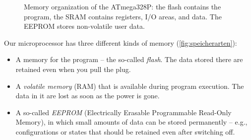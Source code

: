 \documentclass[a4paper,12pt]{article}
\begin{document}
\begin{figure}[ht]
\centering
{}
\caption{
    Memory organization of the ATmega328P: the flash contains the program, the
    SRAM contains registers, I/O areas, and data. The EEPROM stores
    non-volatile user data.
}
\label{fig:speicherarten}
\end{figure}

\noindent
Our microprocessor has three different kinds of memory
(\autoref{fig:speicherarten}):

\begin{itemize}
    \item
	A memory for the program – the so-called \emph{flash}. The data stored
	there are retained even when you pull the plug.
    \item
	A \emph{volatile memory} (RAM) that is available during program
	execution. The data in it are lost as soon as the power is gone.
    \item
	A so-called \emph{EEPROM} (Electrically Erasable Programmable
	Read-Only Memory), in which small amounts of data can be stored
	permanently – e.g., configurations or states that should be retained
	even after switching off.
\end{itemize}
\end{document}
